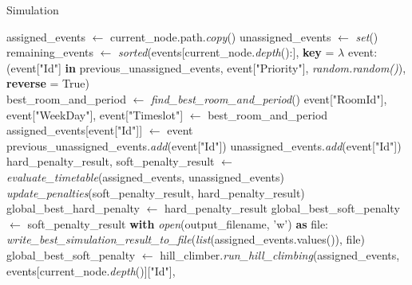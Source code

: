 \begin{algorithm}
\caption{Simulation}\label{simulation}
\begin{algorithmic}[1]
    \State assigned\_events $\gets$ current\_node.path.\textit{copy}()
    \State unassigned\_events $\gets$ \textit{set}()
    \State remaining\_events $\gets$ \textit{sorted}(events[current\_node.\textit{depth}():], 
    \Statex \hspace{3cm} \textbf{key} = $\lambda$ event: (event["Id"] \textbf{in} previous\_unassigned\_events, event["Priority"], \textit{random.random()}), 
    \Statex \hspace{3cm} \textbf{reverse} = True)
    \\
        \State best\_room\_and\_period $\gets$ \textit{find\_best\_room\_and\_period}()
            \State event["RoomId"], event["WeekDay"], event["Timeslot"] $\gets$ best\_room\_and\_period
            \State assigned\_events[event["Id"]] $\gets$ event
        \Else
            \State previous\_unassigned\_events.\textit{add}(event["Id"])
            \State unassigned\_events.\textit{add}(event["Id"])
        \EndIf
    \EndFor
    \\
    \State hard\_penalty\_result, soft\_penalty\_result $\gets$ \textit{evaluate\_timetable}(assigned\_events, unassigned\_events)
    \\
    \State \textit{update\_penalties}(soft\_penalty\_result, hard\_penalty\_result)
    \\
        \State global\_best\_hard\_penalty $\gets$ hard\_penalty\_result
        \State global\_best\_soft\_penalty $\gets$ soft\_penalty\_result
        \State \textbf{with} \textit{open}(output\_filename, 'w') \textbf{as} file:
            \State \hspace{1cm} \textit{write\_best\_simulation\_result\_to\_file}(\textit{list}(assigned\_events.values()), file)
            \State global\_best\_soft\_penalty $\gets$ hill\_climber.\textit{run\_hill\_climbing}(assigned\_events, 
            \Statex \hspace{3cm} events[current\_node.\textit{depth}()]["Id"], 

\end{algorithmic}
\end{algorithm}
